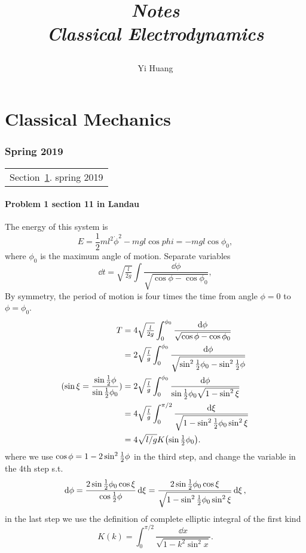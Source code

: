 \documentclass[10pt]{article}
\title{\begin{center}{\Huge \textit{Notes}}\\{{\itshape Classical Electrodynamics}}\end{center}}
\author{Yi Huang}
\affiliation{
University of Minnesota
}
\begin{document}
	\maketitle
	\flushbottom
	\newpage
	\pagestyle{fancynotes}
	\part{Classical Mechanics}
	\section{Spring 2019}\label{sec:spring2019}
	\begin{margintable}\vspace{.8in}\footnotesize
		\begin{tabularx}{\marginparwidth}{|X}
		Section~\ref{sec:spring2019}. spring 2019\\
		\end{tabularx}
	\end{margintable}

\subsection{Problem 1 section 11 in Landau}
The energy of this system is
\begin{equation}
	E = \frac{1}{2} m l^2 \dot{\phi}^2 - mgl\cos{phi} = -mgl\cos{\phi_0},
\end{equation}
where $\phi_0$ is the maximum angle of motion. Separate variables
\begin{equation}
	\dd{t} = \sqrt{\tfrac{l}{2g}} \int \frac{\dd{\phi}}{\sqrt{\cos{\phi} - \cos{\phi_0}}},
\end{equation}
By symmetry, the period of motion is four times the time from angle $\phi = 0$ to $\phi = \phi_0$.
\begin{align*}
	T &= 4 \sqrt{\tfrac{l}{2g}} \int_0^{\phi_0} \frac{\dd{\phi}}{\sqrt{\cos{\phi} - \cos{\phi_0}}}\\
	  &= 2 \sqrt{\tfrac{l}{g}} \int_0^{\phi_0} \frac{\dd{\phi}}{\sqrt{\sin^2{\tfrac{1}{2} \phi_0} - \sin^2{\tfrac{1}{2} \phi}}}\\
		(\sin{\xi} = \frac{\sin{\tfrac{1}{2}\phi}}{\sin{\tfrac{1}{2}\phi_0}})
		&=  2 \sqrt{\tfrac{l}{g}} \int_0^{\phi_0} \frac{\dd{\phi}}{\sin{\tfrac{1}{2}\phi_0} \sqrt{1 - \sin^2{\xi}}}\\
		&= 4 \sqrt{\tfrac{l}{g}} \int_0^{\pi/2} \frac{\dd{\xi}}{\sqrt{1 - \sin^2{\tfrac{1}{2} \phi_0} \sin^2{\xi}}}\\
		&= 4 \sqrt{l/g} K\qty(\sin{\tfrac{1}{2}\phi_0}).
\end{align*}
where we use $\cos{\phi} = 1-2\sin^2{\tfrac{1}{2} \phi}$ in the third step, and change the variable in the 4th step s.t.
\begin{equation}
	\dd{\phi} = \frac{2 \sin{\tfrac{1}{2}\phi_0} \cos{\xi}}{\cos{\tfrac{1}{2}\phi}} \dd{\xi} = \frac{2 \sin{\tfrac{1}{2}\phi_0} \cos{\xi}}{\sqrt{1 - \sin^2{\tfrac{1}{2} \phi_0} \sin^2{\xi}}} \dd{\xi},
\end{equation}
in the last step we use the definition of complete elliptic integral of the first kind
\begin{equation}
	K(k) = \int_0^{\pi/2} \frac{\dd{x}}{\sqrt{1-k^2 \sin^2{x}}}.
\end{equation}
\end{document}
